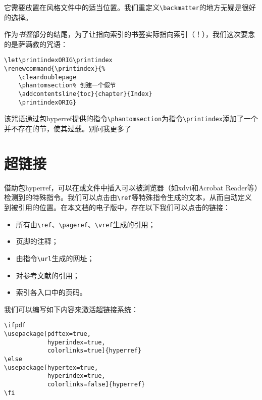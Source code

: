 它需要放置在风格文件中的适当位置。我们重定义\verb|\backmatter|的地方无疑是很好的选择。

\begin{qquestion}
作为\emph{书签}部分的结尾，为了让指向索引的书签实际指向索引（！），我们这次要念的是萨满教的咒语：

\begin{dmd}
\begin{verbatim}
\let\printindexORIG\printindex 
\renewcommand{\printindex}{%
    \cleardoublepage
    \phantomsection% 创建一个假节
    \addcontentsline{toc}{chapter}{Index} 
    \printindexORIG}\end{verbatim}
\end{dmd}

该咒语通过包hyperref提供的指令\verb|\phantomsection|为指令\verb|\printindex|添加了一个并不存在的节，使其过载。别问我更多了\dm{:-)}
\end{qquestion}

\section{超链接}

借助包\textsf{hyperref}，可以在或文件中插入可以被浏览器（如\textsf{xdvi}和\textsf{Acrobat Reader}等）检测到的特殊指令。我们可以点击由\verb|\ref|等特殊指令生成的文本，从而自动定义到被引用的位置。在本文档的电子版中，存在以下我们可以点击的链接：

\begin{itemize}
    \item 所有由\verb|\ref|、\verb|\pageref|、\verb|\vref|生成的引用；
    \item 页脚的注释；
    \item 由指令\verb|\url|生成的网址；
    \item 对参考文献的引用；
    \item 索引各入口中的页码。
\end{itemize}

我们可以编写如下内容来激活超链接系统：

\begin{dmd}
\begin{verbatim}
\ifpdf
\usepackage[pdftex=true,
            hyperindex=true,
            colorlinks=true]{hyperref}
\else
\usepackage[hypertex=true,
            hyperindex=true,
            colorlinks=false]{hyperref}
\fi\end{verbatim}
\end{dmd}

